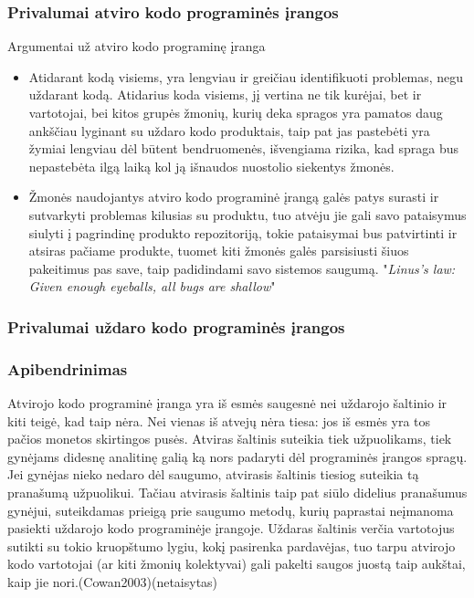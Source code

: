 \documentclass[a4paper,12pt,fleqn]{article}
\begin{document}
\subsubsection{Privalumai atviro kodo programinės įrangos}
\label{sec:data}

Argumentai už atviro kodo programinę įranga
\begin{itemize}
	\item Atidarant kodą visiems, yra lengviau ir greičiau identifikuoti problemas, negu uždarant kodą. Atidarius koda visiems, jį vertina ne tik kurėjai, bet ir vartotojai, bei kitos grupės žmonių, kurių deka spragos yra pamatos daug ankščiau lyginant su uždaro kodo produktais, taip pat jas pastebėti yra žymiai lengviau dėl būtent bendruomenės, išvengiama rizika, kad spraga bus nepastebėta ilgą laiką kol ją išnaudos nuostolio siekentys žmonės.
	\item Žmonės naudojantys atviro kodo programinė įrangą galės patys surasti ir sutvarkyti problemas kilusias su produktu, tuo atvėju jie gali savo pataisymus siulyti į pagrindinę produkto repozitoriją, tokie pataisymai bus patvirtinti ir atsiras pačiame produkte, tuomet kiti žmonės galės parsisiusti šiuos pakeitimus pas save, taip padidindami savo sistemos saugumą. "\textit{Linus's law: Given enough eyeballs, all bugs are shallow}" \cite{Meneely:2009:SOS:1653662.1653717}
\end{itemize}

\subsubsection{Privalumai uždaro kodo programinės įrangos}
\label{sec:data}


\subsubsection{Apibendrinimas}
\label{sec:data}
Atvirojo kodo programinė įranga yra iš esmės saugesnė nei uždarojo šaltinio ir kiti teigė, kad taip nėra. Nei vienas iš atvejų nėra tiesa: jos iš esmės yra tos pačios monetos skirtingos pusės. Atviras šaltinis suteikia tiek užpuolikams, tiek gynėjams didesnę analitinę galią ką nors padaryti dėl programinės įrangos spragų. Jei gynėjas nieko nedaro dėl saugumo, atvirasis šaltinis tiesiog suteikia tą pranašumą užpuolikui. Tačiau atvirasis šaltinis taip pat siūlo didelius pranašumus gynėjui, suteikdamas prieigą prie saugumo metodų, kurių paprastai neįmanoma pasiekti uždarojo kodo programinėje įrangoje. Uždaras šaltinis verčia vartotojus sutikti su tokio kruopštumo lygiu, kokį pasirenka pardavėjas, tuo tarpu atvirojo kodo vartotojai (ar kiti žmonių kolektyvai) gali pakelti saugos juostą taip aukštai, kaip jie nori.(Cowan2003)(netaisytas)
\end{document}
